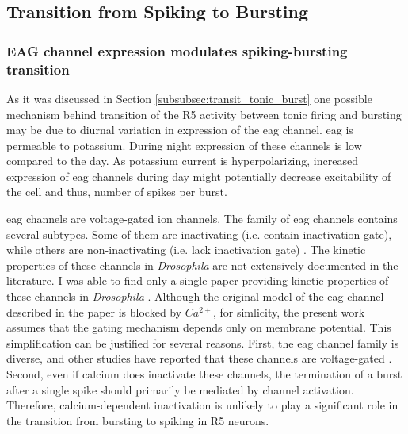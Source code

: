 \documentclass[../main.tex]{subfiles}
\begin{document}
\subsection{Transition from Spiking to Bursting}

\subsubsection{EAG channel expression modulates spiking-bursting transition}

As it was discussed in Section \ref{subsubsec:transit_tonic_burst} one possible mechanism behind transition of the R5 activity between tonic firing and bursting may be due to diurnal variation in expression of the \gls{eag} channel. \gls{eag} is permeable to potassium. During night expression of these channels is low compared to the day. %
As potassium current is hyperpolarizing, increased expression of \gls{eag} channels during day might potentially decrease excitability of the cell and thus, number of spikes per burst.

\gls{eag} channels are voltage-gated ion channels. The family of \gls{eag} channels contains several subtypes. Some of them are inactivating (i.e. contain inactivation gate), while others are non-inactivating (i.e. lack inactivation gate) \parencite{bauerEtheragogoChannelsEffective2018}.
The kinetic properties of these channels in \textit{Drosophila} are not extensively documented in the literature. I was able to find only a single paper providing kinetic properties of these channels in \textit{Drosophila} \parencite{bronkRegulationEagCa22018}. Although the original model of the \gls{eag} channel described in the paper is blocked by $Ca^{2+}$, for simlicity, the present work assumes that the gating mechanism depends only on membrane potential. This simplification can be justified for several reasons. First, the \gls{eag} channel family is diverse, and other studies have reported that these channels are voltage-gated \parencite{bauerEtheragogoChannelsEffective2018}. Second, even if calcium does inactivate these channels, the termination of a burst after a single spike should primarily be mediated by channel activation. Therefore, calcium-dependent inactivation is unlikely to play a significant role in the transition from bursting to spiking in R5 neurons.
\end{document}
